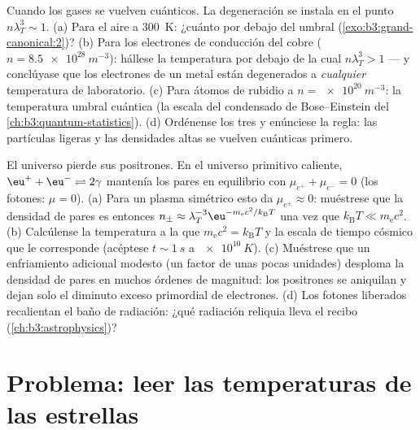 \begin{exercise}[$\star\star\star$]\label{exo:b3:grand-canonical:11}
Cuando los gases se vuelven cuánticos. La degeneración se instala en el
punto $n\lambda_T^3 \sim
1$. (a) Para el aire a \qty{300}{K}: ¿cuánto por debajo
del umbral (\cref{exo:b3:grand-canonical:2})? (b) Para los electrones de
conducción del cobre ($n = \qty{8.5e28}{m^{-3}}$): hállese la temperatura
por debajo de la cual $n\lambda_T^3 > 1$ --- y conclúyase que los electrones
de un metal están degenerados a \emph{cualquier} temperatura de laboratorio.
(c) Para átomos de rubidio a $n = \qty{e20}{m^{-3}}$: la temperatura
umbral cuántica (la escala del condensado de Bose--Einstein del
\cref{ch:b3:quantum-statistics}). (d) Ordénense los tres y enúnciese la
regla: las partículas ligeras y las densidades altas se vuelven cuánticas
primero.
\end{exercise}

\begin{exercise}[$\star\star\star$]\label{exo:b3:grand-canonical:12}
El universo pierde sus positrones. En el universo primitivo caliente,
$\eu^+ + \eu^- \rightleftharpoons 2\gamma$ mantenía los pares en
equilibrio con $\mu_{e^+} + \mu_{e^-} = 0$ (los fotones: $\mu = 0$).
(a) Para un plasma simétrico esto da $\mu_{e^\pm} \approx 0$:
muéstrese que la densidad de pares es entonces $n_\pm \approx
\lambda_T^{-3}\eu^{-m_{\text{e}}c^2/k_{\text{B}}T}$ una vez que
$k_{\text{B}}T \ll m_{\text{e}}c^2$. (b) Calcúlense la temperatura
a la que $m_{\text{e}}c^2 = k_{\text{B}}T$ y la escala de tiempo cósmico
que le corresponde (acéptese $t \sim \qty{1}{s}$ a
$\qty{e10}{K}$). (c) Muéstrese que un enfriamiento adicional modesto (un
factor de unas pocas unidades) desploma la densidad de pares en muchos
órdenes de magnitud: los positrones se aniquilan y dejan solo el diminuto
exceso primordial de electrones. (d) Los fotones liberados recalientan el
baño de radiación: ¿qué radiación reliquia lleva el recibo
(\cref{ch:b3:astrophysics})?
\end{exercise}

\section{Problema: leer las temperaturas de las estrellas}

